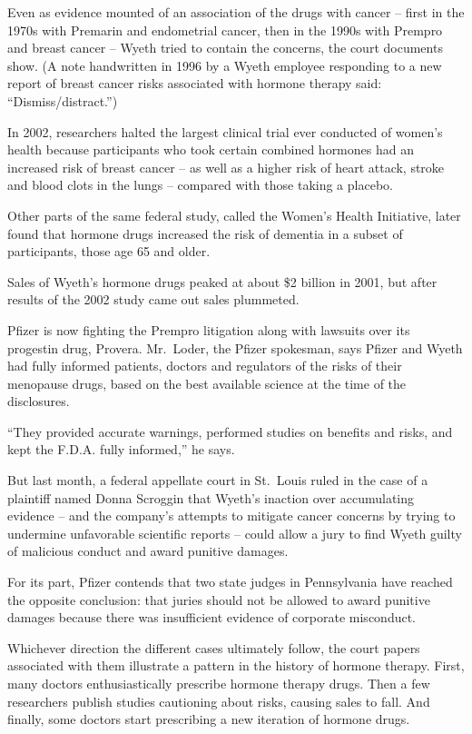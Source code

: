 ﻿\documentclass[12pt]{article}
\begin{document}
Even as evidence mounted of an association of the drugs with cancer -- first in the 1970s with
Premarin and endometrial cancer, then in the 1990s with Prempro and breast cancer -- Wyeth tried to
contain the concerns, the court documents show. (A note handwritten in 1996 by a Wyeth employee
responding to a new report of breast cancer risks associated with hormone therapy said:
``Dismiss/distract.'')

In 2002, researchers halted the largest clinical trial ever conducted of women's health because
participants who took certain combined hormones had an increased risk of breast cancer -- as well as
a higher risk of heart attack, stroke and blood clots in the lungs -- compared with those taking a
placebo.

Other parts of the same federal study, called the Women's Health Initiative, later found that
hormone drugs increased the risk of dementia in a subset of participants, those age 65 and older.

Sales of Wyeth's hormone drugs peaked at about \$2 billion in 2001, but after results of the 2002
study came out sales plummeted.

Pfizer is now fighting the Prempro litigation along with lawsuits over its progestin drug, Provera.
Mr.~Loder, the Pfizer spokesman, says Pfizer and Wyeth had fully informed patients, doctors and
regulators of the risks of their menopause drugs, based on the best available science at the time of
the disclosures.

``They provided accurate warnings, performed studies on benefits and risks, and kept the F.D.A.
fully informed,'' he says.

But last month, a federal appellate court in St.~Louis ruled in the case of a plaintiff named Donna
Scroggin that Wyeth's inaction over accumulating evidence -- and the company's attempts to mitigate
cancer concerns by trying to undermine unfavorable scientific reports -- could allow a jury to find
Wyeth guilty of malicious conduct and award punitive damages.

For its part, Pfizer contends that two state judges in Pennsylvania have reached the opposite
conclusion: that juries should not be allowed to award punitive damages because there was
insufficient evidence of corporate misconduct.

Whichever direction the different cases ultimately follow, the court papers associated with them
illustrate a pattern in the history of hormone therapy. First, many doctors enthusiastically
prescribe hormone therapy drugs. Then a few researchers publish studies cautioning about risks,
causing sales to fall. And finally, some doctors start prescribing a new iteration of hormone drugs.
\end{document}

